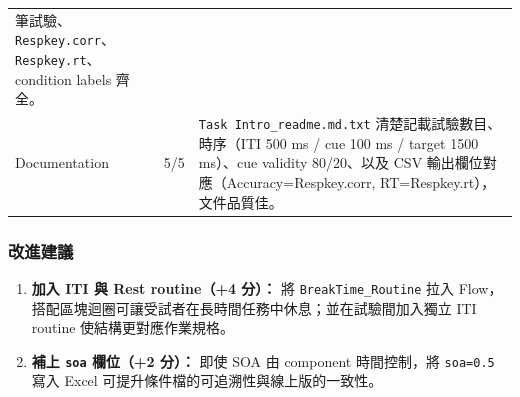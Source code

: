 \documentclass[14pt,]{extarticle}
\providecommand{\tightlist}{%
  \setlength{\itemsep}{0pt}\setlength{\parskip}{0pt}}
\begin{document}
\begin{longtable}[]{@{}lll@{}}
\begin{minipage}[t]{0.09\columnwidth}
筆試驗、\texttt{Respkey.corr}、\texttt{Respkey.rt}、condition labels
齊全。\strut
\end{minipage}\tabularnewline
\begin{minipage}[t]{0.09\columnwidth}\raggedright
Documentation\strut
\end{minipage} & \begin{minipage}[t]{0.09\columnwidth}\raggedright
5/5\strut
\end{minipage} & \begin{minipage}[t]{0.09\columnwidth}\raggedright
\texttt{Task\ Intro\_readme.md.txt} 清楚記載試驗數目、時序（ITI 500 ms /
cue 100 ms / target 1500 ms）、cue validity 80/20、以及 CSV
輸出欄位對應（Accuracy=Respkey.corr, RT=Respkey.rt），文件品質佳。\strut
\end{minipage}\tabularnewline
\bottomrule
\end{longtable}

\hypertarget{ux6539ux9032ux5efaux8b70}{%
\subsubsection{改進建議}\label{ux6539ux9032ux5efaux8b70}}

\begin{enumerate}
\def\labelenumi{\arabic{enumi}.}
\tightlist
\item
  \textbf{加入 ITI 與 Rest routine（+4 分）：} 將
  \texttt{BreakTime\_Routine} 拉入
  Flow，搭配區塊迴圈可讓受試者在長時間任務中休息；並在試驗間加入獨立 ITI
  routine 使結構更對應作業規格。
\item
  \textbf{補上 \texttt{soa} 欄位（+2 分）：} 即使 SOA 由 component
  時間控制，將 \texttt{soa=0.5} 寫入 Excel
  可提升條件檔的可追溯性與線上版的一致性。
\end{enumerate}
\end{document}
